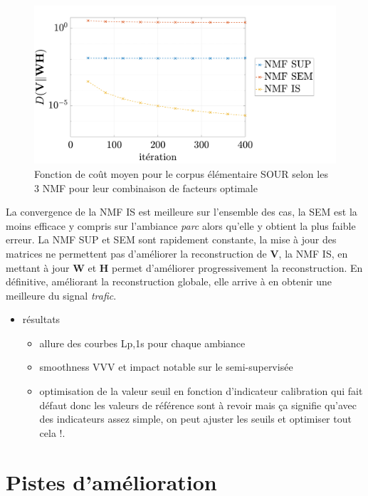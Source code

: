 \begin{figure}[h]
\centering
\includegraphics[width=.8\linewidth]{./figures/resultats/grafic_cost.pdf}
\caption{Fonction de coût moyen pour le corpus élémentaire SOUR selon les 3 NMF pour leur combinaison de facteurs optimale}
\end{figure}


La convergence de la NMF IS est meilleure sur l'ensemble des cas, la SEM est la moins efficace y compris sur l'ambiance \textit{parc} alors qu'elle y obtient la plus faible erreur. La NMF SUP et SEM sont rapidement constante, la mise à jour des matrices ne permettent pas d'améliorer la reconstruction de $\mathbf{V}$, la NMF IS, en mettant à jour $\mathbf{W}$ et $\mathbf{H}$ permet d'améliorer progressivement la reconstruction. En définitive, améliorant la reconstruction globale, elle arrive à en obtenir une meilleure du signal \textit{trafic}.



\begin{itemize}
\item résultats
\begin{itemize}
\item allure des courbes Lp,1s pour chaque ambiance

\item smoothness VVV et impact notable sur le semi-supervisée
\item optimisation de la valeur seuil en fonction d'indicateur
calibration qui fait défaut donc les valeurs de référence sont à revoir mais ça signifie qu'avec des indicateurs assez simple, on peut ajuster les seuils et optimiser tout cela !.
\end{itemize}
\end{itemize}


\section{Pistes d'amélioration}

